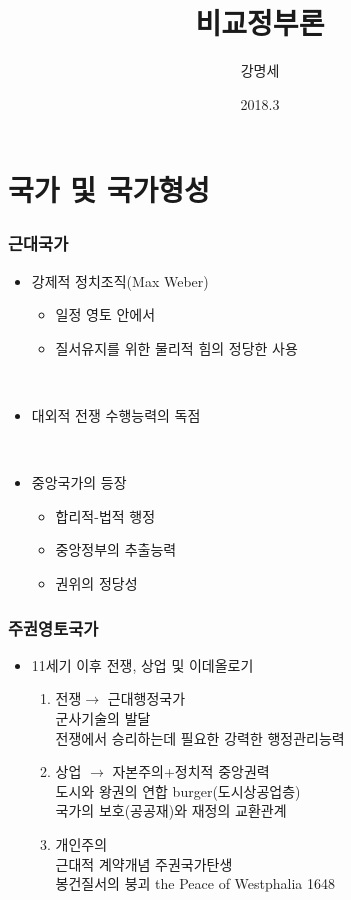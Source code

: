 \documentclass[xcolor=pdftex,dvipsnames]{beamer}
\title[]{비교정부론}
\author[]{강명세}
\institute[]{제종연구소}
\date[]{2018.3}
\renewcommand{\(}{\left(}
\renewcommand{\)}{\right)}
\begin{document}
\begin{frame}
\titlepage
\transboxout
\end{frame}

\section{국가 및 국가형성}


\begin{frame}
\frametitle{근대국가}
\begin{itemize}
\item 강제적 정치조직(Max Weber)
\begin{itemize}
\item 일정 영토 안에서\\
\item 질서유지를 위한 물리적 힘의 정당한 사용\\
\end{itemize}

\

\item 대외적 전쟁 수행능력의 독점

\

\item 중앙국가의 등장
\begin{itemize}
\item 합리적-법적 행정
\item 중앙정부의 추출능력
\item 권위의 정당성
\end{itemize}
\end{itemize}
\end{frame}


\begin{frame}
\frametitle{주권영토국가}
\begin{itemize}
\item 11세기 이후 전쟁, 상업 및 이데올로기
\begin{enumerate}
\item 전쟁$\rightarrow$ 근대행정국가\\
군사기술의 발달\\
전쟁에서 승리하는데 필요한 강력한 행정관리능력 

\item 상업 $\rightarrow$ 자본주의+정치적 중앙권력\\
도시와 왕권의 연합 burger(도시상공업층)\\
국가의 보호(공공재)와 재정의 교환관계\\
\item 개인주의\\
근대적 계약개념 주권국가탄생\\
봉건질서의 붕괴 the Peace of Westphalia 1648
\end{enumerate}
\end{itemize}
\end{frame}
\end{document}
